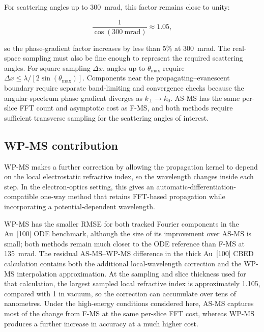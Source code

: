 \documentclass[preprint,12pt,number]{elsarticle}
\begin{document}
For scattering angles up to 300~mrad, this factor remains close to unity:

\[
\frac{1}{\cos(300~\mathrm{mrad})}
\approx 1.05,
\]

so the phase-gradient factor increases by less than 5\% at 300~mrad. The
real-space sampling must also be fine enough to represent the required
scattering angles. For square sampling $\Delta x$, angles up to
$\theta_{\max}$ require
$\Delta x\leq\lambda/[2\sin(\theta_{\max})]$. Components near the
propagating--evanescent boundary require separate band-limiting and convergence
checks because the angular-spectrum phase gradient diverges as
$k_\perp\rightarrow k_0$. AS-MS has the same per-slice FFT count and
asymptotic cost as F-MS, and both methods require sufficient transverse
sampling for the scattering angles of interest.

\subsection{WP-MS contribution}

WP-MS makes a further correction by allowing the propagation kernel to depend on
the local electrostatic refractive index, so the wavelength changes inside each
step. In the electron-optics setting, this gives an
automatic-differentiation-compatible one-way
method that retains FFT-based propagation while
incorporating a potential-dependent wavelength.

WP-MS has the smaller RMSE for both tracked Fourier components in the
Au~[100] ODE benchmark, although the size of its improvement over AS-MS is small; both methods 
remain much closer to the ODE reference than F-MS at
135~mrad. The residual AS-MS--WP-MS difference in the thick
Au~[100] CBED calculation contains both the additional local-wavelength
correction and the WP-MS interpolation approximation. At
the sampling and slice thickness used for that calculation, the largest sampled
local refractive index is approximately 1.105, compared with 1 in vacuum, so the
correction can accumulate over tens of nanometres. Under the high-energy conditions considered
here, AS-MS captures most of the change from F-MS at the same per-slice FFT
cost, whereas WP-MS produces a further increase in accuracy at a much
higher cost.
\end{document}
